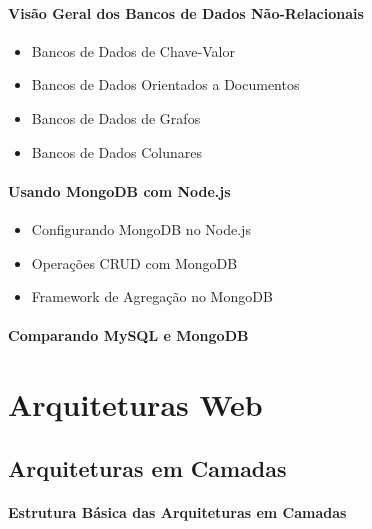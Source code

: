 \subsubsection{Visão Geral dos Bancos de Dados Não-Relacionais}
\begin{itemize}
\item Bancos de Dados de Chave-Valor
\item Bancos de Dados Orientados a Documentos
\item Bancos de Dados de Grafos
\item Bancos de Dados Colunares
\end{itemize}
\subsubsection{Usando MongoDB com Node.js}
\begin{itemize}
\item Configurando MongoDB no Node.js
\item Operações CRUD com MongoDB
\item Framework de Agregação no MongoDB
\end{itemize}
\subsubsection{Comparando MySQL e MongoDB}





























\chapter{Arquiteturas Web}
\section{Arquiteturas em Camadas}

\subsubsection{Estrutura Básica das Arquiteturas em Camadas}
